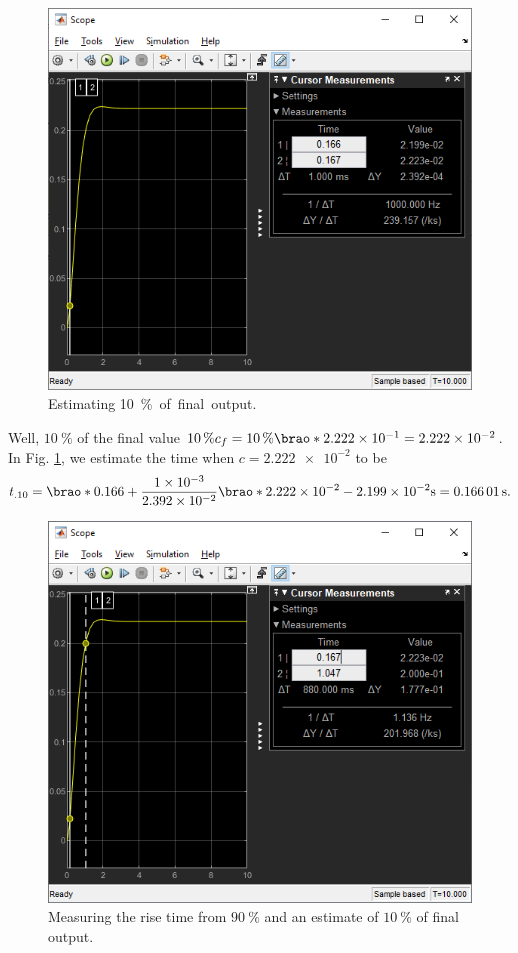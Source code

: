 \documentclass[12pt]{article}
\DeclarePairedDelimiter\brao()%
\begin{document}
\begin{figure}[h]
    \centering
    \includegraphics[width=\linewidth]{part01a_measuring_pc10.png}
    \caption{Estimating \SI{10}\percent of final output.}
    \label{fig:step - estimating 10 percent}
\end{figure}

Well, $\SI{10}\percent$ of the final value $\SI{10}\percent c_f = \SI{10}\percent \brao*{\num{2.222e-1}} = \num{2.222e-2}$.
In Fig. \ref{fig:step - estimating 10 percent}, we estimate the time when $c = \num{2.222e-2}$ to be
$$
	t_{.10} = \brao*{0.166 + \frac{\num{1e-3}}{\num{2.392e-02}}\brao*{\num{2.222e-2} - \num{2.199e-2}}}\si\second = \SI{0.16601}\second.
$$

\begin{figure}[h]
    \centering
    \includegraphics[width=\linewidth]{part01a_measuring_rise_time_estimate_+=.png}
    \caption{Measuring the rise time from $\SI{90}\percent$ and an estimate of $\SI{10}\percent$ of final output.}
    \label{fig:step - measuring rise time}
\end{figure}
\end{document}
